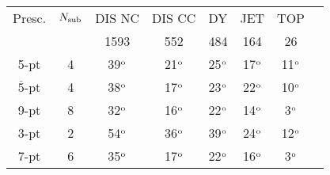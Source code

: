 \renewcommand*{\arraystretch}{1.20}
\begin{tabular}{cccccccc}
 \toprule
Presc. & $N_{\rm sub}$ & DIS NC & DIS CC & DY & JET & TOP \\
\cline{3-7}
& & 1593 & 552 & 484 & 164 & 26 \\
\hline
 5-pt & 4 &39$^{\rm o}$ & 21$^{\rm o}$ & 25$^{\rm o}$ & 17$^{\rm o}$ & 11$^{\rm o}$	\\
$\overline{5}$-pt & 4 & 38$^{\rm o}$ & 17$^{\rm o}$ & 23$^{\rm o}$	& 22$^{\rm o}$ & 10$^{\rm o}$ \\
9-pt & 8 & 32$^{\rm o}$ & 16$^{\rm o}$ & 22$^{\rm o}$ & 14$^{\rm o}$ & 3$^{\rm o}$	\\
\hline
 3-pt & 2 &54$^{\rm o}$ & 36$^{\rm o}$ & 39$^{\rm o}$ & 24$^{\rm o}$ & 12$^{\rm o}$ \\
7-pt & 6 &35$^{\rm o}$ & 17$^{\rm o}$ & 22$^{\rm o}$ & 16$^{\rm o}$ & 3$^{\rm o}$	\\
    \bottomrule
\end{tabular}
